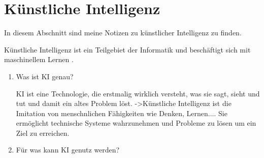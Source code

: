 \section{Künstliche Intelligenz}
\label{sec:ai}

In diesem Abschnitt sind meine Notizen zu künstlicher Intelligenz zu finden.

Künstliche Intelligenz ist ein Teilgebiet der Informatik und beschäftigt sich mit maschinellem Lernen \citep{ai-wikipedia}.

\begin{enumerate}

    \item Was ist KI genau?
    
KI ist eine Technologie, die erstmalig wirklich versteht, was sie sagt, sieht und tut und damit ein altes Problem löst.
->Künstliche Intelligenz ist die Imitation von menschnlichen Fähigkeiten wie Denken, Lernen.... Sie ermöglicht technische Systeme wahrzunehmen und Probleme zu lösen um ein Ziel zu erreichen.
\item Für was kann KI genutz werden?


\end{enumerate}
